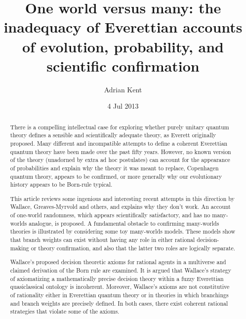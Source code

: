 \documentclass[aps,
pra,epsfig,12pt]{revtex4}
\begin{document}
\title{One world versus many: the inadequacy of Everettian accounts 
of evolution, probability, and scientific confirmation}

\author{Adrian Kent}

\date{4 Jul 2013}

\begin{abstract}
There is a compelling intellectual case for exploring
whether purely unitary quantum theory defines a sensible and 
scientifically adequate theory, as Everett originally proposed.
Many different and incompatible attempts to define a coherent Everettian
quantum theory have been made over the past fifty years.  
However, no known version of the theory (unadorned by extra ad hoc postulates)
can account for the appearance of probabilities and explain why the 
theory it was meant to replace, Copenhagen quantum theory, 
appears to be confirmed, or more generally why our evolutionary history 
appears to be Born-rule typical. 

This article reviews some ingenious and interesting recent attempts in 
this direction by Wallace, Greaves-Myrvold and others, and explains
why they don't work.  An account of one-world randomness, 
which appears scientifically satisfactory, and has no many-worlds
analogue, is proposed.  A fundamental obstacle to confirming many-worlds
theories is illustrated by considering some toy 
many-worlds models.  These models show that branch weights can exist without
having any role in either rational decision-making or theory confirmation,
and also that the latter two roles are logically separate. 

Wallace's proposed decision theoretic axioms for rational agents in 
a multiverse and claimed derivation of the Born rule 
are examined.  It is argued that
Wallace's strategy of axiomatizing a mathematically precise decision theory 
within a fuzzy Everettian quasiclassical ontology is incoherent.   
Moreover, Wallace's axioms 
are not constitutive of rationality either in Everettian quantum theory
or in theories in which branchings and branch weights are precisely
defined.  In both cases, there exist coherent rational strategies 
that violate some of the axioms. 
\end{abstract}
\maketitle
\end{document}
